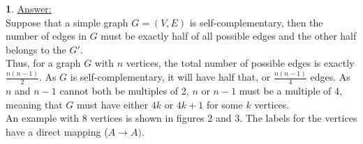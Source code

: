 \documentclass[12pt,a4paper]{article}
\theoremstyle{definition}
\newtheorem{problem}{}
\begin{document}
\begin{problem}
\underline{Answer:} \\
Suppose that a simple graph $G = (V, E)$ is self-complementary, then the number of edges in $G$ must be exactly half of all possible edges and the other half belongs to the $G'$. \\

Thus, for a graph $G$ with $n$ vertices, the total number of possible edges is exactly $\frac{n(n - 1)}{2}$. As $G$ is self-complementary, it will have half that, or $\frac{n(n - 1)}{4}$ edges. As $n$ and $n - 1$ cannot both be multiples of 2, $n$ or $n - 1$ must be a multiple of 4, meaning that $G$ must have either $4k$ or $4k + 1$ for some $k$ vertices. \\

An example with 8 vertices is shown in figures 2 and 3. The labels for the vertices have a direct mapping ($A \rightarrow A)$.


\end{problem}
\end{document}
